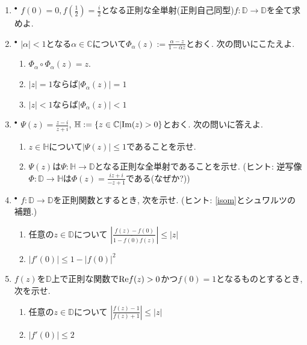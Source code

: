 \documentclass[dvipdfmx,a4paper,11pt]{article}
\newcommand{\C}{\mathbb{C}}
\newcommand{\D}{\mathbb{D}}
\theoremstyle{definition}
\begin{document}
\begin{enumerate}[label=\textbf{問}7.\arabic*]

\item$^{\bullet}$ $f(0)=0, f(\frac{1}{2})=\frac{i}{2}$となる正則な全単射(正則自己同型)$f : \D \to \D$を全て求めよ.

\item \label{isom} $^{\bullet}$ $|\alpha| <1$となる$\alpha \in \C$について$\Phi_{\alpha}(z) := \frac{\alpha - z}{1 - \bar{\alpha} z}$とおく. 次の問いにこたえよ. 
  \begin{enumerate}
\setlength{\parskip}{0cm} 
  \setlength{\itemsep}{0cm} 
  \item $\Phi_{\alpha} \circ \Phi_{\alpha}(z) =z$.
  \item $|z|=1$ならば$|\Phi_{\alpha}(z)|=1$
    \item $|z|<1$ならば$|\Phi_{\alpha}(z)| < 1$
\end{enumerate}

\item \label{HtoD}$^{\bullet}$ $\Psi(z) = \frac{z-i}{z+i}$, $\mathbb{H}:=\{ z \in \C | {\rm Im}(z) >0\}$とおく. 次の問いに答えよ.
  \begin{enumerate}
\setlength{\parskip}{0cm} 
  \setlength{\itemsep}{0cm} 
  \item $z \in \mathbb{H}$について$|\Psi(z)| \le 1$であることを示せ.
  \item $\Psi(z)$は$\Psi :  \mathbb{H} \to \D$となる正則な全単射であることを示せ. (ヒント: 逆写像$\Phi : \D \to \mathbb{H}$は$\Phi(z)=\frac{iz + i}{-z +1}$である(なぜか?))
  \end{enumerate}
  
\item $^{\bullet}$ $f : \D \to \D$を正則関数とするとき, 次を示せ. (ヒント: \ref{isom}とシュワルツの補題.)
  \begin{enumerate}
\setlength{\parskip}{0cm} 
  \setlength{\itemsep}{0cm} 
  \item 任意の$z \in \D$について
  $
  \left|\frac{f(z) - f(0)}{1 - \overline{f(0)} f(z)}\right| \le |z|
  $
  \item $|f' (0)| \le 1 - |f(0)|^2$
    \end{enumerate}
    
    \item $f(z)$を$\D$上で正則な関数で${\rm Re}f(z) >0$かつ$f(0)=1$となるものとするとき, 次を示せ.
     \begin{enumerate}
\setlength{\parskip}{0cm} 
  \setlength{\itemsep}{0cm} 
  \item 任意の$z \in \D$について $ \left|\frac{f(z) -1}{f(z)+1} \right| \le |z|$
    \item $ \left|f'(0) \right| \le 2$
  \end{enumerate} 
  

\end{enumerate}
\end{document}

